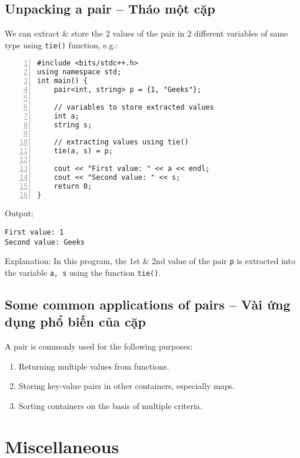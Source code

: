 \documentclass{article}
\begin{document}

\subsection{Unpacking a pair -- Tháo một cặp}
We can extract \& store the 2 values of the pair in 2 different variables of same type using {\tt tie()} function, e.g.:
\begin{Verbatim}[numbers=left,xleftmargin=5mm]
#include <bits/stdc++.h>
using namespace std;
int main() {
    pair<int, string> p = {1, "Geeks"};
	
    // variables to store extracted values
    int a;
    string s;
	
    // extracting values using tie()
    tie(a, s) = p;
	
    cout << "First value: " << a << endl;
    cout << "Second value: " << s;
    return 0;
}
\end{Verbatim}
Output:
\begin{verbatim}
First value: 1
Second value: Geeks
\end{verbatim}
Explanation: In this program, the 1st \& 2nd value of the pair {\tt p} is extracted into the variable {\tt a, s} using the function {\tt tie()}.


\subsection{Some common applications of pairs -- Vài ứng dụng phổ biến của cặp}
A pair is commonly used for the following purposes:
\begin{enumerate}
	\item Returning multiple values from functions.
	\item Storing key-value pairs in other containers, especially maps.
	\item Sorting containers on the basis of multiple criteria.
\end{enumerate}


\section{Miscellaneous}


\printbibliography[heading=bibintoc]
	
\end{document}
